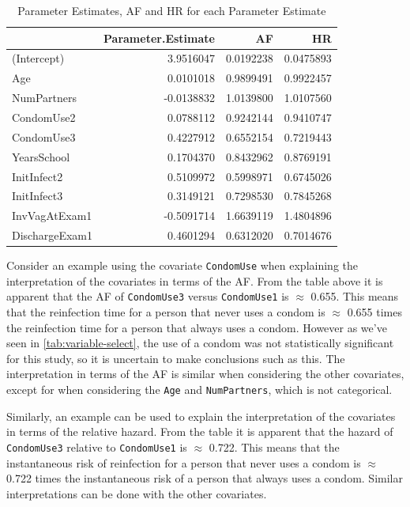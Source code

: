 \documentclass[
]{article}
\begin{document}
\begin{table}

\caption{\label{tab:unnamed-chunk-1}Parameter Estimates, AF and HR for each Parameter Estimate}
\centering
\begin{tabular}[t]{l|r|r|r}
\hline
  & Parameter.Estimate & AF & HR\\
\hline
(Intercept) & 3.9516047 & 0.0192238 & 0.0475893\\
\hline
Age & 0.0101018 & 0.9899491 & 0.9922457\\
\hline
NumPartners & -0.0138832 & 1.0139800 & 1.0107560\\
\hline
CondomUse2 & 0.0788112 & 0.9242144 & 0.9410747\\
\hline
CondomUse3 & 0.4227912 & 0.6552154 & 0.7219443\\
\hline
YearsSchool & 0.1704370 & 0.8432962 & 0.8769191\\
\hline
InitInfect2 & 0.5109972 & 0.5998971 & 0.6745026\\
\hline
InitInfect3 & 0.3149121 & 0.7298530 & 0.7845268\\
\hline
InvVagAtExam1 & -0.5091714 & 1.6639119 & 1.4804896\\
\hline
DischargeExam1 & 0.4601294 & 0.6312020 & 0.7014676\\
\hline
\end{tabular}
\end{table}

Consider an example using the covariate \texttt{CondomUse} when explaining the interpretation of the covariates in terms of the AF. From the table above it is apparent that the AF of \texttt{CondomUse3} versus \texttt{CondomUse1} is \(\approx\) 0.655. This means that the reinfection time for a person that never uses a condom is \(\approx\) 0.655 times the reinfection time for a person that always uses a condom. However as we've seen in \ref{tab:variable-select}, the use of a condom was not statistically significant for this study, so it is uncertain to make conclusions such as this.
The interpretation in terms of the AF is similar when considering the other covariates, except for when considering the \texttt{Age} and \texttt{NumPartners}, which is not categorical.

Similarly, an example can be used to explain the interpretation of the covariates in terms of the relative hazard. From the table it is apparent that the hazard of \texttt{CondomUse3} relative to \texttt{CondomUse1} is \(\approx\) 0.722. This means that the instantaneous risk of reinfection for a person that never uses a condom is \(\approx\) 0.722 times the instantaneous risk of a person that always uses a condom. Similar interpretations can be done with the other covariates.
\end{document}
